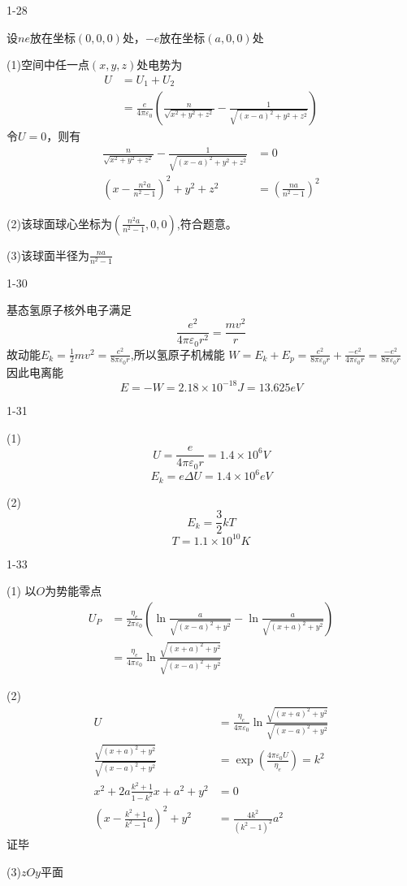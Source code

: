 \documentclass{phyasgn}
\begin{document}
{\heiti\color{red} 1-28}
\begin{sol}
设$ne$放在坐标$(0,0,0)$处，$-e$放在坐标$(a,0,0)$处\par
(1)空间中任一点$(x,y,z)$处电势为
$$
\begin{aligned}
    U&=U_1+U_2\\
    &=\frac{e}{4\pi\varepsilon_0}(\frac{n}{\sqrt{x^2+y^2+z^2}}-\frac{1}{\sqrt{(x-a)^2+y^2+z^2}})
\end{aligned}
$$
令$U=0$，则有
$$
\begin{aligned}
    \frac{n}{\sqrt{x^2+y^2+z^2}}-\frac{1}{\sqrt{(x-a)^2+y^2+z^2}}&=0\\
    (x-\frac{n^2a}{n^2-1})^2+y^2+z^2&=(\frac{na}{n^2-1})^2
\end{aligned}
$$\par
(2)该球面球心坐标为$(\frac{n^2a}{n^2-1},0,0)$,符合题意。\par
(3)该球面半径为$\frac{na}{n^2-1}$
\end{sol}\par

{\heiti\color{red} 1-30}
\begin{sol}
基态氢原子核外电子满足
$$
\frac{e^2}{4\pi\varepsilon_0r^2}=\frac{mv^2}{r}
$$
故动能$E_k=\frac{1}{2}mv^2=\frac{e^2}{8\pi\varepsilon_0r}$,所以氢原子机械能
$W=E_k+E_p=\frac{e^2}{8\pi\varepsilon_0r}+\frac{-e^2}{4\pi\varepsilon_0r}=\frac{-e^2}{8\pi\varepsilon_0r}$
因此电离能
$$
E=-W=2.18\times 10^{-18}J=13.625eV
$$
\end{sol}\par

{\heiti\color{red} 1-31}
\begin{sol}
(1)$$U=\frac{e}{4\pi\varepsilon_0r}=1.4\times 10^6V$$
$$E_k=e\Delta U=1.4\times 10^6eV$$\par
(2)$$E_k=\frac{3}{2}kT$$
$$T=1.1\times 10^{10}K$$
\end{sol}\par

{\heiti\color{red} 1-33}
\begin{sol}
(1)
以$O$为势能零点
$$\begin{aligned}
    U_P&=\frac{\eta_e}{2\pi\varepsilon_0}(\ln\frac{a}{\sqrt{(x-a)^2+y^2}}-\ln\frac{a}{\sqrt{(x+a)^2+y^2}})\\
    &=\frac{\eta_e}{4\pi\varepsilon_0}\ln\frac{\sqrt{(x+a)^2+y^2}}{\sqrt{(x-a)^2+y^2}}
\end{aligned}
$$\par
(2)$$
\begin{aligned}
    U&=\frac{\eta_e}{4\pi\varepsilon_0}\ln\frac{\sqrt{(x+a)^2+y^2}}{\sqrt{(x-a)^2+y^2}}\\
    \frac{\sqrt{(x+a)^2+y^2}}{\sqrt{(x-a)^2+y^2}}&=\exp(\frac{4\pi\varepsilon_0U}{\eta_e})=k^2\\
    x^2+2a\frac{k^2+1}{1-k^2}x+a^2+y^2&=0\\
    (x-\frac{k^2+1}{k^2-1}a)^2+y^2&=\frac{4k^2}{(k^2-1)^2}a^2
\end{aligned}
$$
证毕\par
(3)$zOy$平面
\end{sol}\par
\end{document}
